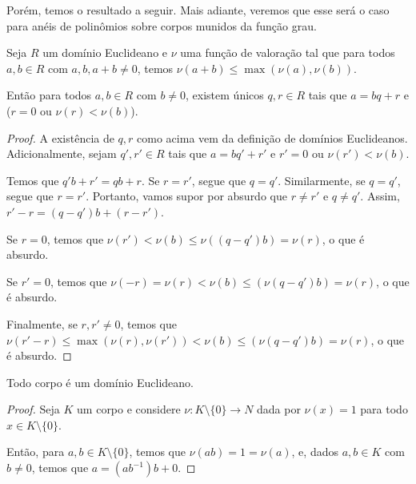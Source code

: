 Porém, temos o resultado a seguir.
Mais adiante, veremos que esse será o caso para anéis de polinômios sobre corpos munidos da função grau.


\begin{prop}
    Seja $R$ um domínio Euclideano e $\nu$ uma função de valoração tal que
    para todos $a, b\in R$ com $a, b, a+b\neq 0$, temos $\nu(a+b)\leq \max(\nu(a), \nu(b))$.
    
    Então para todos $a, b \in R$ com $b\neq 0$, existem únicos $q, r \in R$ tais que $a=bq+r$ e ($r=0$ ou $\nu(r)<\nu(b)$).
\end{prop}
\begin{proof}
    A existência de $q, r$ como acima vem da definição de domínios Euclideanos.
    Adicionalmente, sejam $q', r' \in R$ tais que $a=bq'+r'$ e $r'=0$ ou $\nu(r')<\nu(b)$.

    Temos que $q'b+r'=qb+r$.
    Se $r=r'$, segue que $q=q'$.
    Similarmente, se $q=q'$, segue que $r=r'$.
    Portanto, vamos supor por absurdo que $r\neq r'$ e $q\neq q'$.
    Assim, $r'-r=(q-q')b+(r-r')$.
    
    Se $r=0$, temos que $\nu(r')<\nu(b)\leq \nu((q-q')b)=\nu(r)$, o que é absurdo.

    Se $r'=0$, temos que $\nu(-r)=\nu(r)<\nu(b)\leq(\nu(q-q')b)=\nu(r)$, o que é absurdo.
    
    Finalmente, se $r, r'\neq 0$, temos que $\nu(r'-r)\leq \max(\nu(r), \nu(r'))<\nu(b)\leq(\nu(q-q')b)=\nu(r)$, o que é absurdo.
\end{proof}

\begin{prop}
    Todo corpo é um domínio Euclideano.
\end{prop}
\begin{proof}
Seja $K$ um corpo e considere $\nu:K\setminus \{0\}\to N$ dada por $\nu(x)=1$ para todo $x\in K\setminus \{0\}$.

    Então, para $a, b \in K\setminus \{0\}$, temos que $\nu(ab)=1=\nu(a)$,
    e, dados $a, b\in K$ com $b\neq 0$, temos que $a=(ab^{-1})b+0$.
\end{proof}

